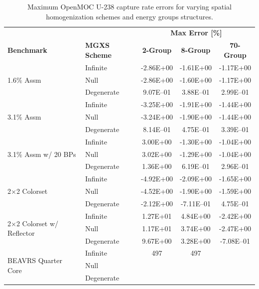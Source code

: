 \begin{table}[h!]
  \centering
  \caption[Maximum OpenMOC U-238 capture rate errors]{Maximum OpenMOC U-238 capture rate errors for varying spatial homogenization schemes and energy groups structures.}
  \small
  \label{table:chap8-openmoc-max-capt-rates}
  \vspace{6pt}
  \begin{tabular}{l l c c c}
  \toprule
  \rowcolor{lightgray}
  & & \multicolumn{3}{c}{\cellcolor{lightgray} \textbf{Max Error [\%]}} \\
  \multirow{-2}{*}{\cellcolor{lightgray} \bf Benchmark} &
  \multirow{-2}{*}{\cellcolor{lightgray} \bf \ac{MGXS} Scheme} &
  \multicolumn{1}{c}{{\cellcolor{lightgray} \bf 2-Group}} &
  \multicolumn{1}{c}{{\cellcolor{lightgray} \bf 8-Group}} &
  \multicolumn{1}{c}{{\cellcolor{lightgray} \bf 70-Group}} \\
  \midrule
\multirow{3}{*}{\parbox{2.5cm}{1.6\% Assm}} & Infinite & -2.86E+00 & -1.61E+00 & -1.17E+00 \\
& Null & -2.86E+00 & -1.60E+00 & -1.17E+00 \\
& Degenerate & 9.07E--01 & 3.88E--01 & 2.99E--01 \\
  \midrule
\multirow{3}{*}{\parbox{2.5cm}{3.1\% Assm}} & Infinite & -3.25E+00 & -1.91E+00 & -1.44E+00 \\
& Null & -3.24E+00 & -1.90E+00 & -1.44E+00 \\
& Degenerate & 8.14E--01 & 4.75E--01 & 3.39E--01 \\
  \midrule
\multirow{3}{*}{\parbox{2.5cm}{3.1\% Assm w/ 20 BPs}} & Infinite & 3.00E+00 & -1.30E+00 & -1.04E+00 \\
& Null & 3.02E+00 & -1.29E+00 & -1.04E+00 \\
& Degenerate & 1.36E+00 & 6.19E--01 & 2.96E--01 \\
  \midrule
\multirow{3}{*}{\parbox{2.5cm}{2$\times$2 Colorset}} & Infinite & -4.92E+00 & -2.09E+00 & -1.65E+00 \\
& Null & -4.52E+00 & -1.90E+00 & -1.59E+00 \\
& Degenerate & -2.12E+00 & -7.11E--01 & 4.75E--01 \\
  \midrule
\multirow{3}{*}{\parbox{2.5cm}{2$\times$2 Colorset w/ Reflector}} & Infinite & 1.27E+01 & 4.84E+00 & -2.42E+00 \\
& Null & 1.17E+01 & 3.74E+00 & -2.47E+00 \\
& Degenerate & 9.67E+00 & 3.28E+00 & -7.08E--01 \\
  \midrule
  \multirow{3}{*}{\parbox{2cm}{\ac{BEAVRS} Quarter Core}} & Infinite & 497 & 497 & \\
  & Null & & & \\
  & Degenerate & & & \\
  \bottomrule
\end{tabular}
\end{table}

